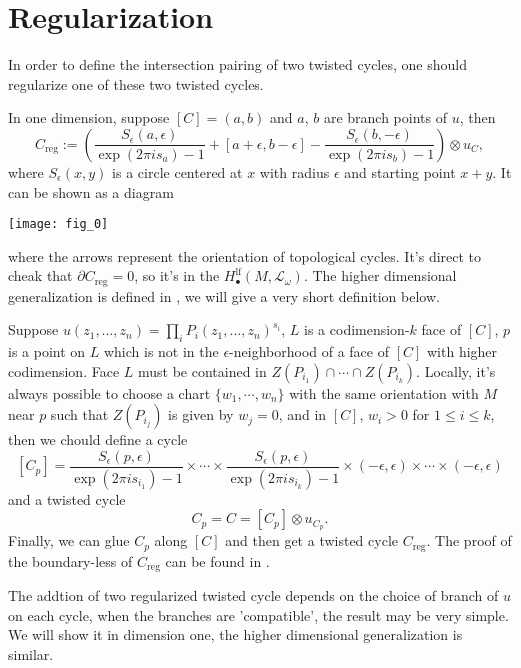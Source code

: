 \documentclass[11pt]{article}
\theoremstyle{definition}
\theoremstyle{plain}
\begin{document}
\section{Regularization}

In order to define the intersection pairing of two twisted 
cycles, one should regularize one of these two twisted cycles. 

In one dimension, suppose $[C]=(a,b)$ and $a$, $b$ are branch 
points of $u$, then 
\[
	C_{\text{reg}}:=\left(\frac{S_{\epsilon}(a,\epsilon)}{\exp(2\pi i s_a)-1}+[a+\epsilon,b-\epsilon]-\frac{S_{\epsilon}(b,-\epsilon)}{\exp(2\pi i s_b)-1}\right)\otimes u_C,
\]
where $S_{\epsilon}(x,y)$ is a circle centered at $x$ 
with radius $\epsilon$ and starting point $x+y$. 
It can be shown as a diagram 
\begin{center}
\texttt{[image: fig\_0]}
\end{center}
where the arrows represent the orientation of topological cycles.
It's direct to cheak that $\partial C_{\text{reg}}=0$, so it's in
the $H^{\text{lf}}_\bullet(M,\mathcal L_{\omega})$.
The higher dimensional generalization is defined in \cite{aomoto2011theory}, we will
give a very short definition below.

Suppose $u(z_1,\dots,z_n)=\prod_i P_i(z_1,\dots,z_n)^{s_i}$, $L$ is a codimension-$k$ face of $[C]$, $p$ is a point on $L$ which is not in the
$\epsilon$-neighborhood of a face of $[C]$ with higher codimension.
Face $L$ must be contained in $Z(P_{i_1})\cap \cdots \cap Z(P_{i_k})$.
Locally, it's always possible to choose a chart $\{w_1,\cdots,w_n\}$
with the same orientation with $M$
near $p$ such that $Z(P_{i_j})$ is given by $w_j=0$, and
in $[C]$, $w_i>0$ for $1\leq i\leq k$, then
we chould define a cycle
\[
	[C_p]=\frac{S_\epsilon(p,\epsilon)}{\exp(2\pi i s_{i_1})-1}\times \cdots \times
	\frac{S_\epsilon(p,\epsilon)}{\exp(2\pi i s_{i_k})-1}\times (-\epsilon,\epsilon)\times \cdots
	\times (-\epsilon,\epsilon)
\]
and a twisted cycle
\[
	C_p=C=[C_p]\otimes u_{C_p}.
\]
Finally, we can glue $C_p$ along $[C]$ and then get a twisted cycle
$C_{\text{reg}}$. The proof of the boundary-less of $C_{\text{reg}}$
can be found in \cite{aomoto2011theory}.

The addtion of two regularized twisted cycle depends on the choice
of branch of $u$ on each cycle, when the branches are 'compatible',
the result may be very simple. We will show it in dimension one, the
higher dimensional generalization is similar.
\end{document}

